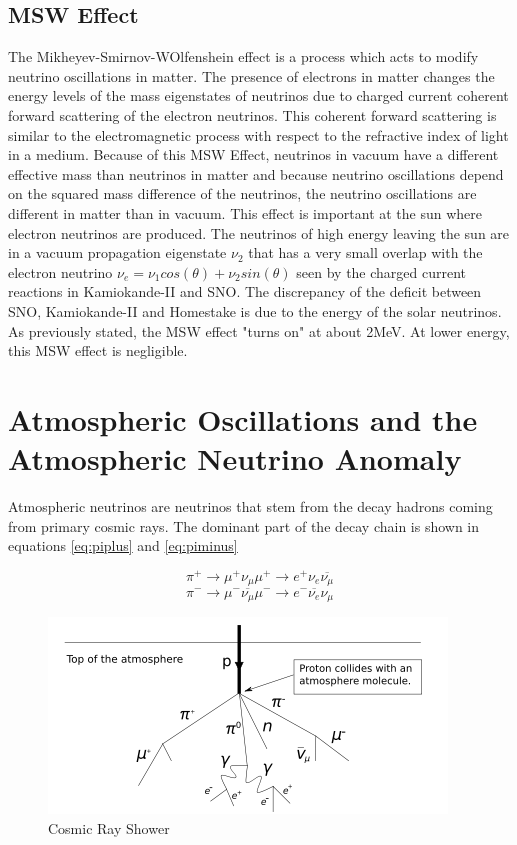 \subsection{MSW Effect}
The Mikheyev-Smirnov-WOlfenshein effect is a process which acts to modify neutrino oscillations in matter. The presence of electrons in matter changes the energy levels of the mass eigenstates of neutrinos due to charged current coherent forward scattering of the electron neutrinos. This coherent forward scattering is similar to the electromagnetic process with respect to the refractive index of light in a medium. Because of this MSW Effect, neutrinos in vacuum have a different effective mass than neutrinos in matter and because neutrino oscillations depend on the squared mass difference of the neutrinos, the neutrino oscillations are different in matter than in vacuum. This effect is important at the sun where electron neutrinos are produced. The neutrinos of high energy leaving the sun are in a vacuum propagation eigenstate $\nu_{2}$ that has a very small overlap with the electron neutrino $\nu_{e}=\nu_{1}cos(\theta)+\nu_{2}sin(\theta)$ seen by the charged current reactions in Kamiokande-II and SNO. The discrepancy of the deficit between SNO, Kamiokande-II and Homestake is due to the energy of the solar neutrinos. As previously stated, the MSW effect "turns on" at about 2MeV. At lower energy, this MSW effect is negligible. \cite{Smirnov:2003da}



\section{Atmospheric Oscillations and the Atmospheric Neutrino Anomaly}
Atmospheric neutrinos are neutrinos that stem from the decay hadrons coming from primary cosmic rays. The dominant part of the decay chain is shown in equations  \ref{eq:piplus} and \ref{eq:piminus}

\begin{equation}
\label{eq:piplus}
\pi^{+} \rightarrow \mu^{+} \nu_{\mu} \mu^{+} \rightarrow e^{+} \nu_{e} \overline{\nu_{\mu}}
\end{equation}
\begin{equation}
\label{eq:piminus}
\pi^{-} \rightarrow \mu^{-} \overline{\nu_{\mu}} \mu^{-} \rightarrow e^{-} \overline{\nu_{e}} \nu_{\mu}
\end{equation}

\begin{figure}[htp]
\centering
\includegraphics[scale=.5]{figs/cosmicray.jpg}
\caption{Cosmic Ray Shower}
\label{fig:cosmicray}
\end{figure}

